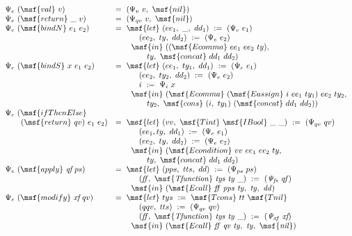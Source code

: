 \documentclass{article}
\begin{document}
\begin{gather}
\begin{array}{lll}  
\Psi_e \ (\msf{val} \ v) & = \ (\Psi_v \ v, \ \msf{nil}) \\
%
\Psi_e \ (\msf{return} \ \_ \ v) & = \ (\Psi_{qv} \ v, \ \msf{nil}) \\
%
\Psi_e \ (\msf{bindN} \ e_1 \ e_2) & = \ \msf{let} \ (ee_1, \ \_,
\ dd_1) \ := \ (\Psi_e \ e_1) \\ & \qquad \quad (ee_2, \ ty, \ dd_2)
\ := \ (\Psi_e \ e_2) \\ & \qquad \msf{in} \ ((\msf{Ecomma} \ ee_1
\ ee_2 \ ty), \\ & \qquad \qquad ty, \ \msf{concat} \ dd_1 \ dd_2) \\
%
\Psi_e \ (\msf{bindS} \ x \ e_1 \ e_2) & = \ \msf{let} \ (ee_1, \ ty_1,
\ dd_1) \ := \ (\Psi_e \ e_1) \\ & \qquad \quad (ee_2, \ ty_2, \ dd_2)
\ := \ (\Psi_e \ e_2) \\ & \qquad \quad i \ := \ \Psi_i \ x \\ & \qquad
\msf{in} \ (\msf{Ecomma} \ (\msf{Eassign} \ i \ ee_1 \ ty_1) \ ee_2
\ ty_2, \\ & \qquad \qquad ty_2, \ \msf{cons} \ (i,\ ty_1)
\ (\msf{concat} \ dd_1 \ dd_2)) \\
%
\Psi_e \ (\msf{ifThenElse} \\ \qquad  (\msf{return} \ qv) \
 e_1 \ e_2) & =
\ \msf{let} \ (vv, \ \msf{Tint} \ \msf{IBool} \ \_ \ \_) \ :=
\ (\Psi_{qv} \ qv) \\ & \qquad \quad (ee_1, ty, \ dd_1) \ := \ (\Psi_e
\ e_1) \\ & \qquad \quad (ee_2, \ ty, \ dd_2) \ := \ (\Psi_e \ e_2)
\\ & \qquad \msf{in} \ (\msf{Econdition} \ vv \ ee_1 \ ee_2 \ ty,
 \\ & \qquad \qquad ty, \ \msf{concat} \ dd_1 \ dd_2) \\
%
\Psi_e \ (\msf{apply} \ \mbox{\it qf} \ ps) & = \ \msf{let} \ (pps,
\ tts, \ dd) \ := \ (\Psi_{ps} \ ps) \\ & \qquad \quad (\it{ff},
\ \msf{Tfunction} \ tys \ ty \ \_) \ := \ (\Psi_{fs} \ qf) \\ & \qquad
\msf{in} \ (\msf{Ecall} \ \it{ff} \ pps \ ty, \ ty, \ dd) \\
%
\Psi_e \ (\msf{modify} \ \mbox{\it xf} \ qv) & = \ \msf{let} \ tys
\ := \ \msf{Tcons} \ tt \ \msf{Tnil} \\ & \qquad \quad (qqv, \ tts)
\ := \ (\Psi_{qv} \ qv) \\ & \qquad \quad (\it{ff}, \ \msf{Tfunction}
\ tys \ ty \ \_) \ := \ (\Psi_{\it{xf}} \ \mbox{\it xf}) \\ & \qquad
\msf{in} \ (\msf{Ecall} \ \it{ff} \ qv \ ty, \ ty, \ \msf{nil})
\end{array}
\end{gather}
\end{document}
